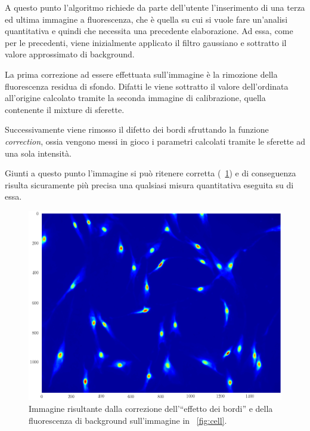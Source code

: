 A questo punto l'algoritmo richiede da parte dell'utente l'inserimento di una terza ed ultima immagine a fluorescenza, che è quella su cui si vuole fare un'analisi quantitativa e quindi che necessita una precedente elaborazione.
Ad essa, come per le precedenti, viene inizialmente applicato il filtro gaussiano e sottratto il valore approssimato di background.

La prima correzione ad essere effettuata sull'immagine è la rimozione della fluorescenza residua di sfondo. 
Difatti le viene sottratto il valore dell'ordinata all'origine calcolato tramite la seconda immagine di calibrazione,  quella contenente il mixture di sferette.

Successivamente viene rimosso il difetto dei bordi sfruttando la funzione \textit{correction}, ossia vengono messi in gioco i parametri calcolati tramite le sferette ad una sola intensità.

Giunti a questo punto l'immagine si può ritenere corretta (\figurename~\ref{fig:cellcorr}) e di conseguenza risulta sicuramente più precisa una qualsiasi misura quantitativa eseguita su di essa.

\begin{figure}
 \centering
 \includegraphics[scale=.60]{img/CAP3cellcorr.png}
 \caption{\small{Immagine risultante dalla correzione dell'``effetto dei bordi'' e della fluorescenza di background sull'immagine in \figurename~\ref{fig:cell}.}}
 \label{fig:cellcorr}
\end{figure}